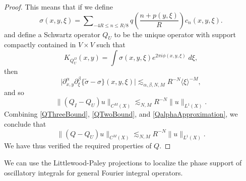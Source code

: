 \begin{proof}
    This means that if we define
    \begin{equation} \sigma(x,y,\xi) = \sum\nolimits_{-4R \leq n \leq R/8} q \left( \frac{n + p(y,\xi)}{R} \right) c_n(x,y,\xi). \end{equation}
    and define a Schwartz operator $Q_U$ to be the unique operator with support compactly contained in $V \times V$ such that
    \begin{equation} K_{Q_U^\Omega}(x,y) = \int \sigma(x,y,\xi) e^{2 \pi i \phi(x,y,\xi)}\; d\xi, \end{equation}
    then
    \begin{equation} \Big|\partial_{x,y}^\alpha \partial_\xi^\beta \big\{ \tilde{\sigma} - \sigma \big\}(x,y,\xi) \Big| \lesssim_{\alpha,\beta,N,M} R^{-N} \langle \xi \rangle^{-M}, \end{equation}
    and so
    \begin{equation} \label{QalphaApproximation}
        \| ( Q_I - Q_U ) u \|_{C^M(X)} \lesssim_{N,M} R^{-N} \| u \|_{L^1(X)}.
    \end{equation}
    Combining \eqref{QThreeBound}, \eqref{QTwoBound}, and \eqref{QalphaApproximation}, we conclude that
    \begin{equation} \label{QApproximationTheorem}
        \| (Q - Q_U) u \|_{C^M(X)} \lesssim_{N,M} R^{-N} \| u \|_{L^1(X)}.
    \end{equation}
    We have thus verified the required properties of $Q$.
\end{proof}

We can use the Littlewood-Paley projections to localize the phase support of oscillatory integrals for general Fourier integral operators.

